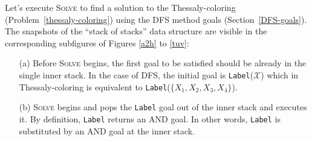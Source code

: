 \documentclass{ws-ijait}
\begin{document}
Let's execute \textsc{Solve} to find a solution to the
Thessaly-coloring (Problem~\ref{thessaly-coloring}) using
the DFS method goals (Section~\ref{DFS-goals}). The
snapshots of the ``stack of stacks'' data structure are
visible in the corresponding subfigures of Figures \ref{a2h}
to \ref{tuv}:
\begin{enumerate}
  \item[(a)] Before \textsc{Solve} begins, the first goal to
             be satisfied should be already in the single
             inner stack. In the case of DFS, the initial
             goal is \texttt{Label}($\mathscr{X}$) which in
             Thessaly-coloring is equivalent to
             \texttt{Label}($\{X_1, X_2, X_3, X_4\}$).
  \item[(b)] \textsc{Solve} begins and pops the
             \texttt{Label} goal out of the inner stack and
             executes it. By definition, \texttt{Label}
             returns an \textsf{AND} goal. In other words,
             \texttt{Label} is substituted by an
             \textsf{AND} goal at the inner stack.


\end{enumerate}
\end{document}
